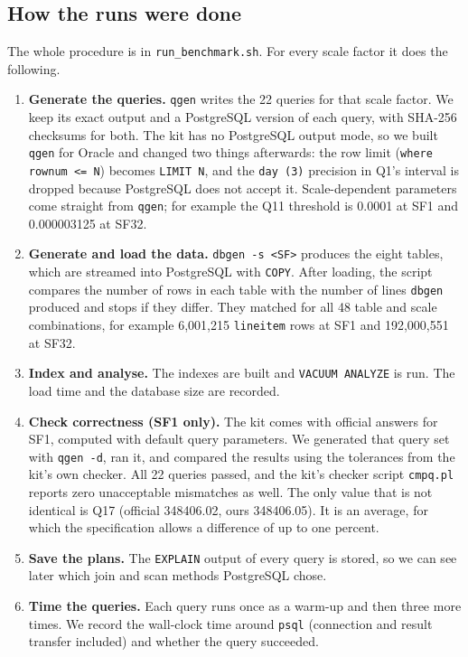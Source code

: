 \documentclass[11pt,a4paper]{article}
\newcommand{\file}[1]{\texttt{#1}}
\begin{document}
\subsection{How the runs were done}

The whole procedure is in \file{run\_benchmark.sh}. For every scale factor it
does the following.

\begin{enumerate}
\item \textbf{Generate the queries.} \file{qgen} writes the 22 queries for
that scale factor. We keep its exact output and a PostgreSQL version of each
query, with SHA-256 checksums for both. The kit has no PostgreSQL output
mode, so we built \file{qgen} for Oracle and changed two things afterwards:
the row limit (\file{where rownum <= N}) becomes \file{LIMIT N}, and the
\file{day (3)} precision in Q1's interval is dropped because PostgreSQL does
not accept it. Scale-dependent parameters come straight from \file{qgen}; for
example the Q11 threshold is 0.0001 at SF1 and 0.000003125 at SF32.
\item \textbf{Generate and load the data.} \file{dbgen -s <SF>} produces the
eight tables, which are streamed into PostgreSQL with \file{COPY}. After
loading, the script compares the number of rows in each table with the number
of lines \file{dbgen} produced and stops if they differ. They matched for all
48 table and scale combinations, for example 6{,}001{,}215 \file{lineitem}
rows at SF1 and 192{,}000{,}551 at SF32.
\item \textbf{Index and analyse.} The indexes are built and
\file{VACUUM ANALYZE} is run. The load time and the database size are
recorded.
\item \textbf{Check correctness (SF1 only).} The kit comes with official
answers for SF1, computed with default query parameters. We generated that
query set with \file{qgen -d}, ran it, and compared the results using the
tolerances from the kit's own checker. All 22 queries passed, and the kit's
checker script \file{cmpq.pl} reports zero unacceptable mismatches as well.
The only value that is not identical is Q17 (official 348406.02, ours
348406.05). It is an average, for which the specification allows a
difference of up to one percent.
\item \textbf{Save the plans.} The \file{EXPLAIN} output of every query is
stored, so we can see later which join and scan methods PostgreSQL chose.
\item \textbf{Time the queries.} Each query runs once as a warm-up and then
three more times. We record the wall-clock time around \file{psql}
(connection and result transfer included) and whether the query succeeded.
\end{enumerate}
\end{document}
